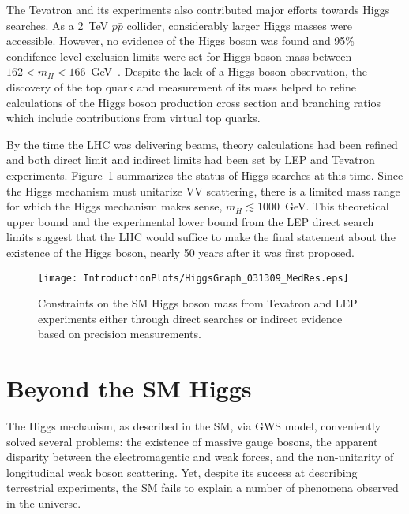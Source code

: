 The Tevatron
and its experiments also contributed major efforts towards Higgs
searches.  As a 2~TeV $p\bar{p}$ collider, considerably larger 
Higgs masses were accessible.  However, no evidence of the 
Higgs boson  was found and 95\% condifence level exclusion limits
were set for Higgs boson mass between
$162<m_H<166$~GeV~\cite{Aaltonen:2010yv}.  
Despite the lack of a Higgs boson observation, the discovery of
the top quark and measurement of its mass helped
to refine calculations of the Higgs boson production cross section
and branching ratios which include contributions from virtual
top quarks.

By the time the LHC was delivering beams, theory
calculations had been refined and both direct limit and indirect
limits had been set by LEP and Tevatron experiments.
Figure~\ref{fig:HiggsConstraints} summarizes the 
status of Higgs searches at this time.  Since the Higgs mechanism
must unitarize VV scattering, there is a limited mass range for 
which the Higgs mechanism makes sense, $m_H\lesssim1000$~GeV.
This theoretical upper bound and the experimental lower bound from
the LEP direct search limits suggest that the LHC would suffice
to make the final statement about the existence of the Higgs
boson, nearly 50 years after it was first proposed.  

\begin{figure}
\begin{center}
\texttt{[image: IntroductionPlots/HiggsGraph\_031309\_MedRes.eps]}
\caption{Constraints on the SM Higgs boson mass from Tevatron and 
LEP experiments either through direct searches or indirect 
evidence based on precision measurements. 
}
\label{fig:HiggsConstraints}
\end{center}
\end{figure}

\section{Beyond the SM Higgs}

The Higgs mechanism, as described in the SM, 
via GWS model, conveniently solved several problems:
the existence of massive gauge bosons, the apparent disparity
between the electromagentic and weak forces, and the non-unitarity
of longitudinal weak boson scattering. Yet, despite its success
at describing terrestrial 
experiments, the SM fails to explain a number of phenomena 
observed in the universe.
  
